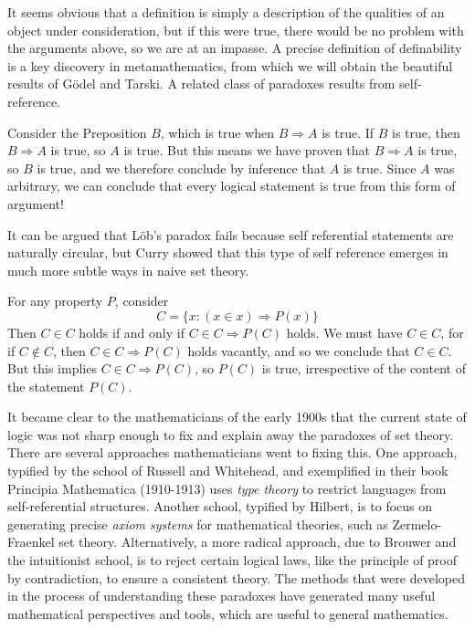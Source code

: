 It seems obvious that a definition is simply a description of the qualities of an object under consideration, but if this were true, there would be no problem with the arguments above, so we are at an impasse. A precise definition of definability is a key discovery in metamathematics, from which we will obtain the beautiful results of G\"{o}del and Tarski. A related class of paradoxes results from self-reference.

\begin{example}[L\"{o}b's Pardox (1955)]
    Consider the Preposition $B$, which is true when $B \Rightarrow A$ is true. If $B$ is true, then $B \Rightarrow A$ is true, so $A$ is true. But this means we have proven that $B \Rightarrow A$ is true, so $B$ is true, and we therefore conclude by inference that $A$ is true. Since $A$ was arbitrary, we can conclude that every logical statement is true from this form of argument!
\end{example}

It can be argued that L\"{o}b's paradox fails because self referential statements are naturally circular, but Curry showed that this type of self reference emerges in much more subtle ways in naive set theory.

\begin{example}[Curry]
    For any property $P$, consider
    \[ C = \{ x : (x \in x) \Rightarrow P(x) \} \]
    Then $C \in C$ holds if and only if $C \in C \Rightarrow P(C)$ holds. We must have $C \in C$, for if $C \not \in C$, then $C \in C \Rightarrow P(C)$ holds vacantly, and so we conclude that $C \in C$. But this implies $C \in C \Rightarrow P(C)$, so $P(C)$ is true, irrespective of the content of the statement $P(C)$.
\end{example}

It became clear to the mathematicians of the early 1900s that the current state of logic was not sharp enough to fix and explain away the paradoxes of set theory. There are several approaches mathematicians went to fixing this. One approach, typified by the school of Russell and Whitehead, and exemplified in their book Principia Mathematica (1910-1913) uses \emph{type theory} to restrict languages from self-referential structures. Another school, typified by Hilbert, is to focus on generating precise \emph{axiom systems} for mathematical theories, such as Zermelo-Fraenkel set theory. Alternatively, a more radical approach, due to Brouwer and the intuitionist school, is to reject certain logical laws, like the principle of proof by contradiction, to ensure a consistent theory. The methods that were developed in the process of understanding these paradoxes have generated many useful mathematical perspectives and tools, which are useful to general mathematics.

